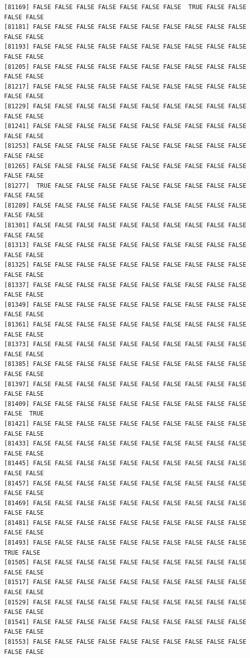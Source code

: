 \documentclass[
  a4paper,
  DIV=11,
  numbers=noendperiod]{scrartcl}
\begin{document}
\begin{verbatim}
[81169] FALSE FALSE FALSE FALSE FALSE FALSE FALSE  TRUE FALSE FALSE FALSE FALSE
[81181] FALSE FALSE FALSE FALSE FALSE FALSE FALSE FALSE FALSE FALSE FALSE FALSE
[81193] FALSE FALSE FALSE FALSE FALSE FALSE FALSE FALSE FALSE FALSE FALSE FALSE
[81205] FALSE FALSE FALSE FALSE FALSE FALSE FALSE FALSE FALSE FALSE FALSE FALSE
[81217] FALSE FALSE FALSE FALSE FALSE FALSE FALSE FALSE FALSE FALSE FALSE FALSE
[81229] FALSE FALSE FALSE FALSE FALSE FALSE FALSE FALSE FALSE FALSE FALSE FALSE
[81241] FALSE FALSE FALSE FALSE FALSE FALSE FALSE FALSE FALSE FALSE FALSE FALSE
[81253] FALSE FALSE FALSE FALSE FALSE FALSE FALSE FALSE FALSE FALSE FALSE FALSE
[81265] FALSE FALSE FALSE FALSE FALSE FALSE FALSE FALSE FALSE FALSE FALSE FALSE
[81277]  TRUE FALSE FALSE FALSE FALSE FALSE FALSE FALSE FALSE FALSE FALSE FALSE
[81289] FALSE FALSE FALSE FALSE FALSE FALSE FALSE FALSE FALSE FALSE FALSE FALSE
[81301] FALSE FALSE FALSE FALSE FALSE FALSE FALSE FALSE FALSE FALSE FALSE FALSE
[81313] FALSE FALSE FALSE FALSE FALSE FALSE FALSE FALSE FALSE FALSE FALSE FALSE
[81325] FALSE FALSE FALSE FALSE FALSE FALSE FALSE FALSE FALSE FALSE FALSE FALSE
[81337] FALSE FALSE FALSE FALSE FALSE FALSE FALSE FALSE FALSE FALSE FALSE FALSE
[81349] FALSE FALSE FALSE FALSE FALSE FALSE FALSE FALSE FALSE FALSE FALSE FALSE
[81361] FALSE FALSE FALSE FALSE FALSE FALSE FALSE FALSE FALSE FALSE FALSE FALSE
[81373] FALSE FALSE FALSE FALSE FALSE FALSE FALSE FALSE FALSE FALSE FALSE FALSE
[81385] FALSE FALSE FALSE FALSE FALSE FALSE FALSE FALSE FALSE FALSE FALSE FALSE
[81397] FALSE FALSE FALSE FALSE FALSE FALSE FALSE FALSE FALSE FALSE FALSE FALSE
[81409] FALSE FALSE FALSE FALSE FALSE FALSE FALSE FALSE FALSE FALSE FALSE  TRUE
[81421] FALSE FALSE FALSE FALSE FALSE FALSE FALSE FALSE FALSE FALSE FALSE FALSE
[81433] FALSE FALSE FALSE FALSE FALSE FALSE FALSE FALSE FALSE FALSE FALSE FALSE
[81445] FALSE FALSE FALSE FALSE FALSE FALSE FALSE FALSE FALSE FALSE FALSE FALSE
[81457] FALSE FALSE FALSE FALSE FALSE FALSE FALSE FALSE FALSE FALSE FALSE FALSE
[81469] FALSE FALSE FALSE FALSE FALSE FALSE FALSE FALSE FALSE FALSE FALSE FALSE
[81481] FALSE FALSE FALSE FALSE FALSE FALSE FALSE FALSE FALSE FALSE FALSE FALSE
[81493] FALSE FALSE FALSE FALSE FALSE FALSE FALSE FALSE FALSE FALSE  TRUE FALSE
[81505] FALSE FALSE FALSE FALSE FALSE FALSE FALSE FALSE FALSE FALSE FALSE FALSE
[81517] FALSE FALSE FALSE FALSE FALSE FALSE FALSE FALSE FALSE FALSE FALSE FALSE
[81529] FALSE FALSE FALSE FALSE FALSE FALSE FALSE FALSE FALSE FALSE FALSE FALSE
[81541] FALSE FALSE FALSE FALSE FALSE FALSE FALSE FALSE FALSE FALSE FALSE FALSE
[81553] FALSE FALSE FALSE FALSE FALSE FALSE FALSE FALSE FALSE FALSE FALSE FALSE

\end{verbatim}
\end{document}
